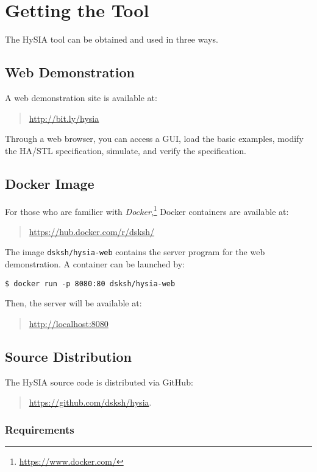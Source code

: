\documentclass[12pt,a4paper]{article}
\begin{document}
\section{Getting the Tool}

The HySIA tool can be obtained and used in three ways.

\subsection{Web Demonstration}

A web demonstration site is available at:
\begin{quote}
\url{http://bit.ly/hysia}
\end{quote}
%
Through a web browser, you can access a GUI, load the basic examples, modify the HA/STL specification, simulate, and verify the specification.


\subsection{Docker Image}

For those who are familier with \emph{Docker},\footnote{\url{https://www.docker.com/}} Docker containers are available at: 
\begin{quote}        
\url{https://hub.docker.com/r/dsksh/}
\end{quote}        

The image \verb|dsksh/hysia-web| contains the server program for the web demonstration. A container can be launched by:
\begin{verbatim}
$ docker run -p 8080:80 dsksh/hysia-web
\end{verbatim}
Then, the server will be available at:
\begin{quote}
\url{http://localhost:8080}
\end{quote}


\subsection{Source Distribution}

The HySIA source code is distributed via GitHub:
\begin{quote}
\url{https://github.com/dsksh/hysia}.
\end{quote}

\subsubsection*{Requirements}
\end{document}
